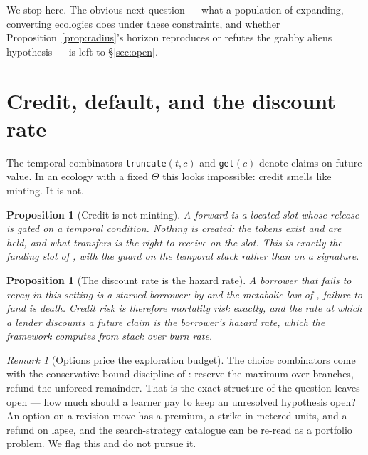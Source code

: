 \documentclass[11pt]{article}
\theoremstyle{plain}
\newtheorem{proposition}[theorem]{Proposition}
\theoremstyle{definition}
\theoremstyle{remark}
\newtheorem{remark}[theorem]{Remark}
\begin{document}
We stop here. The obvious next question --- what a population of expanding,
converting ecologies does under these constraints, and whether
Proposition~\ref{prop:radius}'s horizon reproduces or refutes the grabby
aliens hypothesis \cite{hanson} --- is left to \S\ref{sec:open}.

\section{Credit, default, and the discount rate}
\label{sec:credit}

The temporal combinators \texttt{truncate}$(t,c)$ and \texttt{get}$(c)$
denote claims on future value. In an ecology with a fixed $\Theta$ this
looks impossible: credit smells like minting. It is not.

\begin{proposition}[Credit is not minting]
A forward is a located slot whose release is gated on a temporal
condition. Nothing is created: the tokens exist and are held, and what
transfers is the right to receive on the slot. This is exactly the funding
slot of \cite[\S3.2]{finrho}, with the guard on the temporal stack rather
than on a signature.
\end{proposition}

\begin{proposition}[The discount rate is the hazard rate]
A borrower that fails to repay in this setting is a starved borrower: by
\cite[Def.~1]{MC} and the metabolic law of \cite[\S5]{scientist}, failure
to fund is death. Credit risk is therefore mortality risk exactly, and the
rate at which a lender discounts a future claim is the borrower's hazard
rate, which the framework computes from stack over burn rate.
\end{proposition}

\begin{remark}[Options price the exploration budget]
The choice combinators come with the conservative-bound discipline of
\cite[\S3.5]{finrho}: reserve the maximum over branches, refund the
unforced remainder. That is the exact structure of the question
\cite[\S6]{scientist} leaves open --- how much should a learner pay to keep
an unresolved hypothesis open? An option on a revision move has a premium,
a strike in metered units, and a refund on lapse, and the search-strategy
catalogue can be re-read as a portfolio problem. We flag this and do not
pursue it.
\end{remark}
\end{document}
